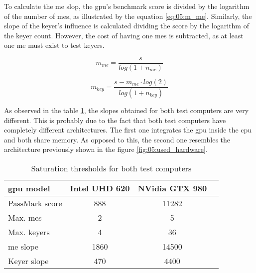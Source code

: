 \documentclass[../main.tex]{subfiles}
\begin{document}
To calculate the \gls{me} slop, the \gls{gpu}'s benchmark score is divided by the logarithm of the number of \glspl{me}, as illustrated by the equation \eqref{eq:05:m_me}. Similarly, the slope of the keyer's influence is calculated dividing the score by the logarithm of the keyer count. However, the cost of having one \glspl{me} is subtracted, as at least one \gls{me} must exist to test keyers.

\begin{equation}\label{eq:05:m_me}
    m_{me} = \frac{s}{log(1 + n_{me})}
\end{equation}

\begin{equation}\label{eq:05:m_key}
    m_{key} = \frac{s - m_{me} \cdot log(2)}{log(1 + n_{key})}
\end{equation}

As observed in the table \ref{tab:05:gpu_saturation}, the slopes obtained for both test computers are very different. This is probably due to the fact that both test computers have completely different architectures. The first one integrates the \gls{gpu} inside the \gls{cpu} and both share memory. As opposed to this, the second one resembles the architecture previously shown in the figure \ref{fig:05:used_hardware}.\newline

\begin{table}[htbp]
    \centering
    \begin{tabular}{|l|c|c|c|}
        \hline
        \Gls{gpu} model         & Intel UHD 620     & NVidia GTX 980    \\\hline   
        PassMark score          & 888               & 11282             \\\hline
        Max. \glspl{me}         & 2                 & 5                 \\\hline
        Max. keyers             & 4                 & 36                \\\hline
        \gls{me} slope          & 1860              & 14500             \\\hline
        Keyer slope             & 470               & 4400              \\\hline
    \end{tabular}

    \caption{Saturation thresholds for both test computers}
    \label{tab:05:gpu_saturation}
\end{table}
\end{document}

